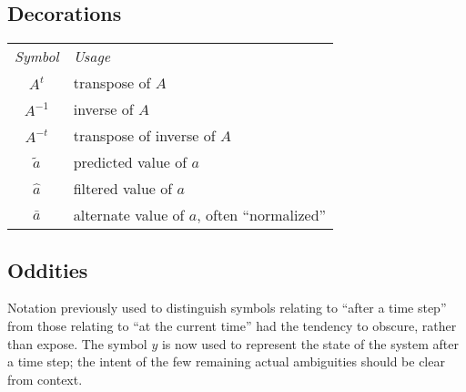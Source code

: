 \subsection{Decorations}

\begin{tabular}{cl}
   {\it Symbol} & {\it Usage}
\\ $A^t$        & transpose of $A$
\\ $A^{-1}$     & inverse of $A$
\\ $A^{-t}$     & transpose of inverse of $A$
\\ ${\tilde a}$ & predicted value of $a$
\\ ${\hat a}$   & filtered value of $a$
\\ ${\bar a}$   & alternate value of $a$,
                        often ``normalized''
\end{tabular}

\subsection{Oddities}

Notation previously used to distinguish
symbols relating to ``after a time step''
from those relating to ``at the current time''
had the tendency to obscure,
rather than expose.
The symbol $y$ is now used to represent
the state of the system after a time step;
the intent of the few remaining actual ambiguities
should be clear from context.
